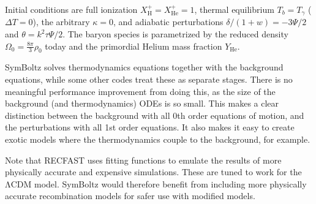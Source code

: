 \documentclass{aa}
\newcommand{\LCDM}{$\mathrm{\Lambda C D M}$}
\newcommand\Hy{\mathrm{H}} %
\newcommand\He{\mathrm{He}} %
\begin{document}
Initial conditions are full ionization $X_\Hy^+ = X_\He^+ = 1$, thermal equilibrium $T_b = T_\gamma$ ($\Delta T = 0$), the arbitrary $\kappa = 0$, and adiabatic perturbations $\delta/(1+w) = -3 \Psi / 2$ and $\theta = k^2 \tau \Psi / 2$.
The baryon species is parametrized by the reduced density $\Omega_0 = \frac{8\pi}{3}\rho_0$ today and the primordial Helium mass fraction $Y_\He$.

SymBoltz solves thermodynamics equations together with the background equations, while some other codes treat these as separate stages.
There is no meaningful performance improvement from doing this, as the size of the background (and thermodynamics) ODEs is so small.
This makes a clear distinction between the background with all 0th order equations of motion, and the perturbations with all 1st order equations.
It also makes it easy to create exotic models where the thermodynamics couple to the background, for example.

Note that RECFAST uses fitting functions to emulate the results of more physically accurate and expensive simulations.
These are tuned to work for the \LCDM{} model.
SymBoltz would therefore benefit from including more physically accurate recombination models for safer use with modified models.
\end{document}
